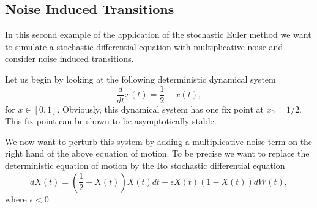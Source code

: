 \subsection{Noise Induced Transitions}
In this second example of the application of the stochastic Euler 
method we want to simulate a stochastic differential equation with
multiplicative noise and consider noise induced transitions.

Let us begin by looking at the following deterministic dynamical 
system
\begin{equation*}
\frac{d}{dt} x(t) = \frac{1}{2} - x(t),
\end{equation*}
for $x \in [0,1]$. Obviously, this dynamical system has one 
fix point at $x_0=1/2$. This fix point can be shown to be 
asymptotically stable. 

We now want to perturb this system by adding a multiplicative 
noise term on the right hand of the above equation of motion.
To be precise we want to replace the deterministic equation of 
motion by the Ito stochastic differential equation
\begin{equation}
\label{SDENOISEIN}
dX(t) = (\frac{1}{2} - X(t))X(t)dt + \epsilon X(t) (1-X(t)) dW(t),
\end{equation}
where $\epsilon <0$


